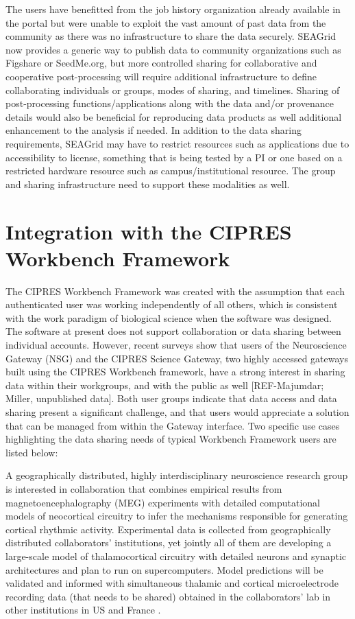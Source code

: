 \documentclass[sigconf]{acmart}
\begin{document}
The users have benefitted from the job history organization already available in the portal but were unable to exploit the vast amount of past data from the community as there was no infrastructure to share the data securely. SEAGrid now provides a generic way to publish data to community organizations such as Figshare or SeedMe.org, but more controlled sharing for collaborative and cooperative post-processing will require additional infrastructure to define collaborating individuals or groups, modes of sharing, and timelines. Sharing of post-processing functions/applications along with the data and/or provenance details would also be beneficial for reproducing data products as well additional enhancement to the analysis if needed.
In addition to the data sharing requirements, SEAGrid may have to restrict resources such as applications due to accessibility to license, something that is being tested by a PI  or one  based on a restricted hardware resource such as campus/institutional  resource. The group and sharing infrastructure need to support these modalities as well. 

\section{Integration with the CIPRES Workbench Framework}\label{nsg}

The CIPRES Workbench Framework \cite{miller2015cipres} was created with the assumption that each authenticated user was working independently of all others, which is consistent with the work paradigm of biological science when the software was designed. The software at present does not support collaboration or data sharing between individual accounts. However, recent surveys show that users of the Neuroscience Gateway (NSG) and the CIPRES Science Gateway, two highly accessed gateways built using the CIPRES Workbench framework, have a strong interest in sharing data within their workgroups, and with the public as well [REF-Majumdar; Miller, unpublished data]. Both user groups indicate that data access and data sharing present a significant challenge, and that users would appreciate a solution that can be managed from within the Gateway interface. Two specific use cases highlighting the data sharing needs of typical Workbench Framework users  are listed below:

A geographically distributed, highly interdisciplinary neuroscience research group is interested in collaboration that combines empirical results from magnetoencephalography (MEG) experiments with detailed computational models of neocortical circuitry to infer the mechanisms responsible for generating cortical rhythmic activity. Experimental data is collected from geographically distributed collaborators' institutions, yet jointly all of them are developing a large-scale model of thalamocortical circuitry with detailed neurons and synaptic architectures and plan to run on supercomputers. Model predictions will be validated and informed with simultaneous thalamic and cortical microelectrode recording data (that needs to be shared) obtained in the collaborators' lab in other institutions in US and France \cite{delorme2004eeglab}. 
\end{document}
